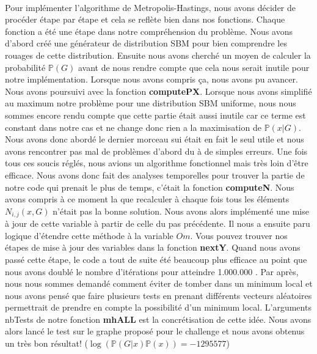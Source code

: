 \paragraph*{}
Pour implémenter l'algorithme de Metropolis-Hastings, nous avons décider de 
procéder étape par étape et cela se reflète bien dans nos fonctions. Chaque 
fonction a été une étape dans notre compréhension du problème. Nous avons 
d'abord créé une générateur de distribution SBM pour bien comprendre les 
rouages de cette distribution. Ensuite nous avons cherché un moyen de calculer
la probabilité $\mathbb{P}(G)$ avant de nous rendre compte que cela nous serait inutile 
pour notre implémentation. Lorsque nous avons compris ça, nous avons pu avancer.
Nous avons poursuivi avec la fonction \textbf{computePX}. Lorsque nous avons simplifié au maximum 
notre problème pour une distribution SBM uniforme, nous nous sommes encore rendu compte
que cette partie était aussi inutile car ce terme est constant dans notre cas et ne change 
donc rien a la maximisation de $\mathbb{P}(x|G)$. Nous avons donc abordé le dernier morceau 
sui était en fait le seul utile et nous avons rencontrer pas mal de problèmes d'abord du à de 
simples erreurs. Une fois tous ces soucis réglés, nous avions un algorithme fonctionnel mais 
très loin d'être efficace. Nous avons donc fait des analyses temporelles pour trouver la partie 
de notre code qui prenait le plus de temps, c'était la fonction \textbf{computeN}. Nous avons compris
à ce moment la que recalculer à chaque fois tous les éléments $N_{i,j}(x,G)$ n'était pas la bonne 
solution. Nous avons alors implémenté une mise à jour de cette variable à partir de celle du pas
précédente. Il nous a ensuite paru logique d'étendre cette méthode à la variable $Om$. Vous pouvez 
trouver nos étapes de mise à jour des variables dans la fonction \textbf{nextY}. Quand nous avons
passé cette étape, le code a tout de suite été beaucoup plus efficace au point que nous avons doublé
le nombre d'itérations pour atteindre 1.000.000 . Par après, nous nous sommes demandé comment 
éviter de tomber dans un minimum local et nous avons pensé que faire plusieurs tests en prenant 
différents vecteurs aléatoires permettrait de prendre en compte la possibilité d'un minimum local.
L'arguments nbTests de notre fonction \textbf{mhALL} est la concrétisation de cette idée.
Nous avons alors lancé le test sur le graphe proposé pour le challenge et nous avons obtenus un très 
bon résultat! ($\log(\mathbb{P}(G|x)\mathbb{P}(x)) = -1295577$)